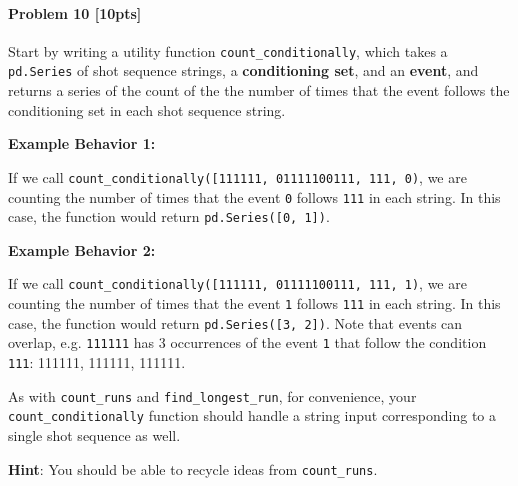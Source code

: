 \documentclass[11pt]{article}
\begin{document}
\paragraph{Problem 10 {[}10pts{]}}\label{problem-10-10pts}

Start by writing a utility function \texttt{count\_conditionally}, which
takes a \texttt{pd.Series} of shot sequence strings, a
\textbf{conditioning set}, and an \textbf{event}, and returns a series
of the count of the the number of times that the event follows the
conditioning set in each shot sequence string.

\textbf{Example Behavior 1:}

If we call
\texttt{count\_conditionally({[}\textquotesingle{}111111\textquotesingle{},\ \textquotesingle{}01111100111\textquotesingle{}{]},\ \textquotesingle{}111\textquotesingle{},\ \textquotesingle{}0\textquotesingle{})},
we are counting the number of times that the event \texttt{0} follows
\texttt{111} in each string. In this case, the function would return
\texttt{pd.Series({[}0,\ 1{]})}.

\textbf{Example Behavior 2:}

If we call
\texttt{count\_conditionally({[}\textquotesingle{}111111\textquotesingle{},\ \textquotesingle{}01111100111\textquotesingle{}{]},\ \textquotesingle{}111\textquotesingle{},\ \textquotesingle{}1\textquotesingle{})},
we are counting the number of times that the event \texttt{1} follows
\texttt{111} in each string. In this case, the function would return
\texttt{pd.Series({[}3,\ 2{]})}. Note that events can overlap, e.g.
\texttt{111111} has 3 occurrences of the event \texttt{1} that follow
the condition \texttt{111}: {111}{1}11, 1{111}{1}1, 11{111}{1}.

As with \texttt{count\_runs} and \texttt{find\_longest\_run}, for
convenience, your \texttt{count\_conditionally} function should handle a
string input corresponding to a single shot sequence as well.

\textbf{Hint}: You should be able to recycle ideas from
\texttt{count\_runs}.
\end{document}

